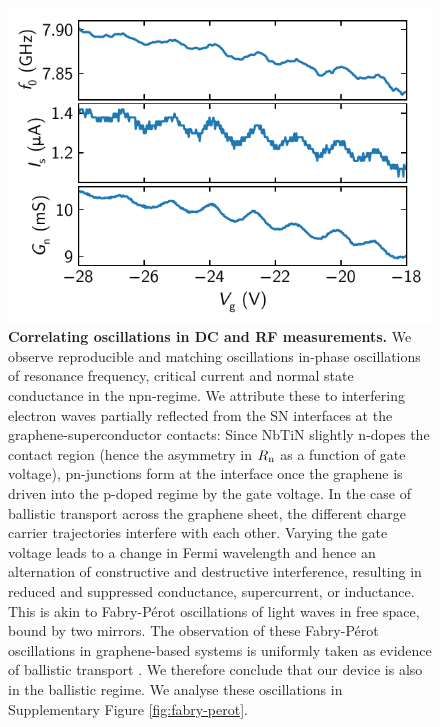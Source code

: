 \begin{figure}[]
	\centering
	\includegraphics[width=.6\linewidth]{chapter-gJJ/figs/si_corr_osc}
	\caption{\textbf{Correlating oscillations in DC and RF measurements.}
		We observe reproducible and matching oscillations in-phase oscillations of resonance frequency, critical current and normal state conductance in the npn-regime.
		We attribute these to interfering electron waves partially reflected from the SN interfaces at the graphene-superconductor contacts:
		Since NbTiN slightly n-dopes the contact region (hence the asymmetry in $R_{\rm n}$ as a function of gate voltage), pn-junctions form at the interface once the graphene is driven into the p-doped regime by the gate voltage.
		In the case of ballistic transport across the graphene sheet, the different charge carrier trajectories interfere with each other.
		Varying the gate voltage leads to a change in Fermi wavelength and hence an alternation of constructive and destructive interference, resulting in reduced and suppressed conductance, supercurrent, or inductance.
		This is akin to Fabry-P\'erot oscillations of light waves in free space, bound by two mirrors.
		The observation of these Fabry-P\'erot oscillations in graphene-based systems is uniformly taken as evidence of ballistic transport \cite{liang_fabry_2001,miao_phasecoherent_2007,young_quantum_2009,cho_massless_2011,wu_quantum_2012,campos_quantum_2012,rickhaus_ballistic_2013,benshalom_quantum_2015,calado_ballistic_2015a,amet_supercurrent_2016a,borzenets_ballistic_2016a,allen_observation_2017,zhu_supercurrent_2018}.
		We therefore conclude that our device is also in the ballistic regime.
		We analyse these oscillations in Supplementary Figure \ref{fig:fabry-perot}.
	} 
	\label{fig:quantum_osc}
\end{figure}

